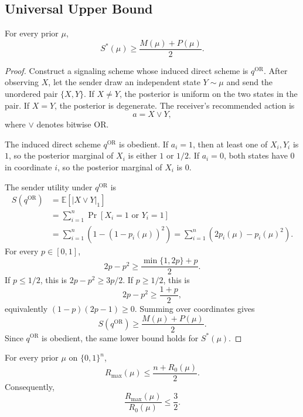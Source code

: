 \documentclass[format=acmsmall, review=false]{acmart}
\begin{document}
\subsection{Universal Upper Bound}

\begin{lemma}
\label{lem:or-scheme-lower-bound}
For every prior $\mu$,
\[
S^*(\mu)\geq \frac{M(\mu)+P(\mu)}{2}.
\]
\end{lemma}

\begin{proof}
Construct a signaling scheme whose induced direct scheme is
$q^{\mathrm{OR}}$. After observing $X$, let the sender draw an independent state
$Y\sim\mu$ and send the unordered pair $\{X,Y\}$. If $X\neq Y$, the posterior is
uniform on the two states in the pair. If $X=Y$, the posterior is degenerate.
The receiver's recommended action is
\[
a=X\vee Y,
\]
where $\vee$ denotes bitwise OR.

The induced direct scheme $q^{\mathrm{OR}}$ is obedient. If $a_i=1$, then at
least one of $X_i,Y_i$ is $1$, so the posterior marginal of $X_i$ is either $1$
or $1/2$. If $a_i=0$, both states have $0$ in coordinate $i$, so the posterior
marginal of $X_i$ is $0$.

The sender utility under $q^{\mathrm{OR}}$ is
\[
\begin{aligned}
S(q^{\mathrm{OR}})
&=\mathbb{E}[|X\vee Y|_1]\\
&=\sum_{i=1}^n \Pr[X_i=1\text{ or }Y_i=1]\\
&=\sum_{i=1}^n \left(1-(1-p_i(\mu))^2\right)
=\sum_{i=1}^n (2p_i(\mu)-p_i(\mu)^2).
\end{aligned}
\]
For every $p\in[0,1]$,
\[
2p-p^2\geq \frac{\min\{1,2p\}+p}{2}.
\]
If $p\leq 1/2$, this is $2p-p^2\geq 3p/2$. If $p\geq 1/2$, this is
\[
2p-p^2\geq \frac{1+p}{2},
\]
equivalently $(1-p)(2p-1)\geq 0$. Summing over coordinates gives
\[
S(q^{\mathrm{OR}})\geq \frac{M(\mu)+P(\mu)}{2}.
\]
Since $q^{\mathrm{OR}}$ is obedient, the same lower bound holds for
$S^*(\mu)$.
\end{proof}

\begin{theorem}
\label{thm:universal-upper-bound}
For every prior $\mu$ on $\{0,1\}^n$,
\[
R_{\max}(\mu)\leq \frac{n+R_0(\mu)}{2}.
\]
Consequently,
\[
\frac{R_{\max}(\mu)}{R_0(\mu)}\leq \frac32.
\]
\end{theorem}
\end{document}
